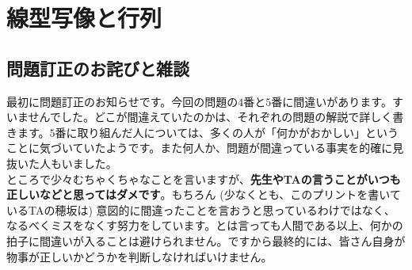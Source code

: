 \chapter{線型写像と行列}


\section{問題訂正のお詫びと雑談}

最初に問題訂正のお知らせです。今回の問題の$4$番と$5$番に間違いがあります。すいませんでした。どこが間違えていたのかは、それぞれの問題の解説で詳しく書きます。$5$番に取り組んだ人については、多くの人が「何かがおかしい」ということに気づいていたようです。また何人か、問題が間違っている事実を的確に見抜いた人もいました。\\

ところで少々むちゃくちゃなことを言いますが、\textbf{先生やTAの言うことがいつも正しいなどと思ってはダメです}。もちろん (少なくとも、このプリントを書いているTAの穂坂は) 意図的に間違ったことを言おうと思っているわけではなく、なるべくミスをなくす努力をしています。とは言っても人間である以上、何かの拍子に間違いが入ることは避けられません。ですから最終的には、皆さん自身が物事が正しいかどうかを判断しなければいけません。

